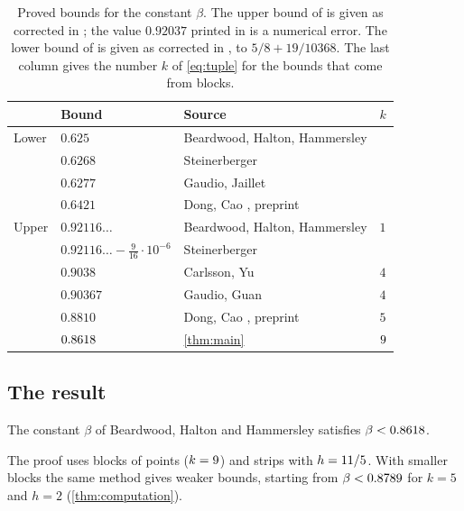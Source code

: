 \begin{table}[ht]
\centering
\caption{Proved bounds for the constant $\beta$. The upper bound of \cite{BeardwoodHaltonHammersley1959} is given as corrected in \cite{Steinerberger2015}; the value $0.92037$ printed in \cite{BeardwoodHaltonHammersley1959} is a numerical error. The lower bound of \cite{Steinerberger2015} is given as corrected in \cite{GaudioJaillet2020}, to $5/8+19/10368$. The last column gives the number $k$ of \eqref{eq:tuple} for the bounds that come from blocks.}
\label{tab:history}
\begin{tabular}{@{}llll@{}}
\toprule
 & Bound & Source & $k$ \\
\midrule
Lower & $0.625$ & Beardwood, Halton, Hammersley \cite{BeardwoodHaltonHammersley1959} & \\
      & $0.6268$ & Steinerberger \cite{Steinerberger2015} & \\
      & $0.6277$ & Gaudio, Jaillet \cite{GaudioJaillet2020} & \\
      & $0.6421$ & Dong, Cao \cite{DongCao2026}, preprint & \\
\midrule
Upper & $0.92116\ldots$ & Beardwood, Halton, Hammersley \cite{BeardwoodHaltonHammersley1959} & $1$ \\
      & $0.92116\ldots-\tfrac{9}{16}\cdot10^{-6}$ & Steinerberger \cite{Steinerberger2015} & \\
      & $0.9038$ & Carlsson, Yu \cite{CarlssonYu2026} & $4$ \\
      & $0.90367$ & Gaudio, Guan \cite{GaudioGuan2026} & $4$ \\
      & $0.8810$ & Dong, Cao \cite{DongCao2026}, preprint & $5$ \\
      & $0.8618$ & \cref{thm:main} & $9$ \\
\bottomrule
\end{tabular}
\end{table}

\subsection{The result}

\begin{thm}\label{thm:main}
The constant $\beta$ of Beardwood, Halton and Hammersley satisfies $\beta<0.8618$.
\end{thm}

The proof uses blocks of \MainPoints{} points ($k=9$) and strips with $h=11/5$. With smaller blocks the same method gives weaker bounds, starting from $\beta<0.8789$ for $k=5$ and $h=2$ (\cref{thm:computation}).


